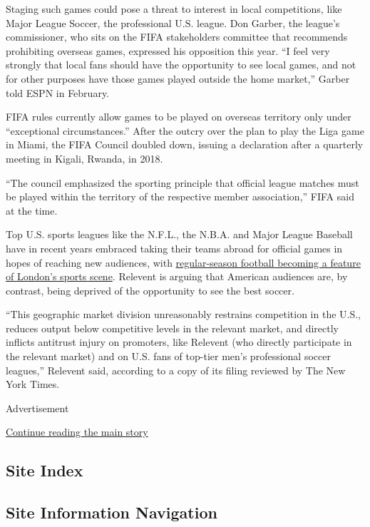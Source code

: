 Staging such games could pose a threat to interest in local
competitions, like Major League Soccer, the professional U.S. league.
Don Garber, the league's commissioner, who sits on the FIFA stakeholders
committee that recommends prohibiting overseas games, expressed his
opposition this year. ``I feel very strongly that local fans should have
the opportunity to see local games, and not for other purposes have
those games played outside the home market,'' Garber told ESPN in
February.

FIFA rules currently allow games to be played on overseas territory only
under ``exceptional circumstances.'' After the outcry over the plan to
play the Liga game in Miami, the FIFA Council doubled down, issuing a
declaration after a quarterly meeting in Kigali, Rwanda, in 2018.

``The council emphasized the sporting principle that official league
matches must be played within the territory of the respective member
association,'' FIFA said at the time.

Top U.S. sports leagues like the N.F.L., the N.B.A. and Major League
Baseball have in recent years embraced taking their teams abroad for
official games in hopes of reaching new audiences, with
\href{https://www.nytimes3xbfgragh.onion/2015/10/25/sports/football/nfl-pushes-deeper-into-overseas-market.html}{regular-season
football becoming a feature of London's sports scene}. Relevent is
arguing that American audiences are, by contrast, being deprived of the
opportunity to see the best soccer.

``This geographic market division unreasonably restrains competition in
the U.S., reduces output below competitive levels in the relevant
market, and directly inflicts antitrust injury on promoters, like
Relevent (who directly participate in the relevant market) and on U.S.
fans of top-tier men's professional soccer leagues,'' Relevent said,
according to a copy of its filing reviewed by The New York Times.

Advertisement

\protect\hyperlink{after-bottom}{Continue reading the main story}

\hypertarget{site-index}{%
\subsection{Site Index}\label{site-index}}

\hypertarget{site-information-navigation}{%
\subsection{Site Information
Navigation}\label{site-information-navigation}}

